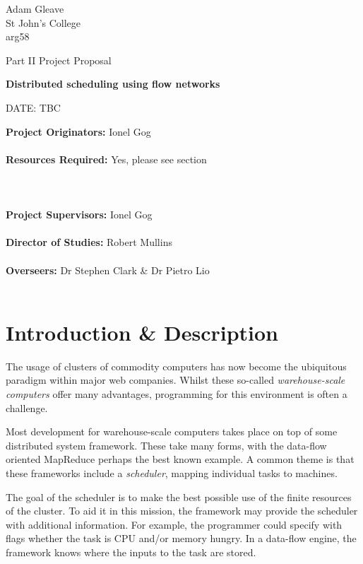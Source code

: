 \begin{flushright}
	\small {
		Adam Gleave \\
		St John's College \\
		arg58
	}
\end{flushright}

\vfill

\centerline{\Large Part II Project Proposal}
\vspace{0.4in}
\centerline{\LARGE \textbf{Distributed scheduling using flow networks}}
\vspace{0.4in}
\centerline{\large DATE: TBC}

\vfill

\textbf{Project Originators:} Ionel Gog \hfil \\ \\
\textbf{Resources Required:} Yes, please see section~ \hfil \\ \\ \\ \\
\textbf{Project Supervisors:} Ionel Gog \hfil \\ \\
\textbf{Director of Studies:} Robert Mullins \hfil \\ \\
\textbf{Overseers:} Dr Stephen Clark \& Dr Pietro Lio \hfil \\ \\

\vfil 

\section*{Introduction \& Description}

The usage of clusters of commodity computers has now become the ubiquitous paradigm within major web companies. Whilst these so-called \emph{warehouse-scale computers} offer many advantages, programming for this environment is often a challenge.

Most development for warehouse-scale computers takes place on top of some distributed system framework. These take many forms, with the data-flow oriented MapReduce perhaps the best known example. A common theme is that these frameworks include a \emph{scheduler}, mapping individual tasks to machines. 

The goal of the scheduler is to make the best possible use of the finite resources of the cluster. To aid it in this mission, the framework may provide the scheduler with additional information. For example, the programmer could specify with flags whether the task is CPU and/or memory hungry. In a data-flow engine, the framework knows where the inputs to the task are stored.


